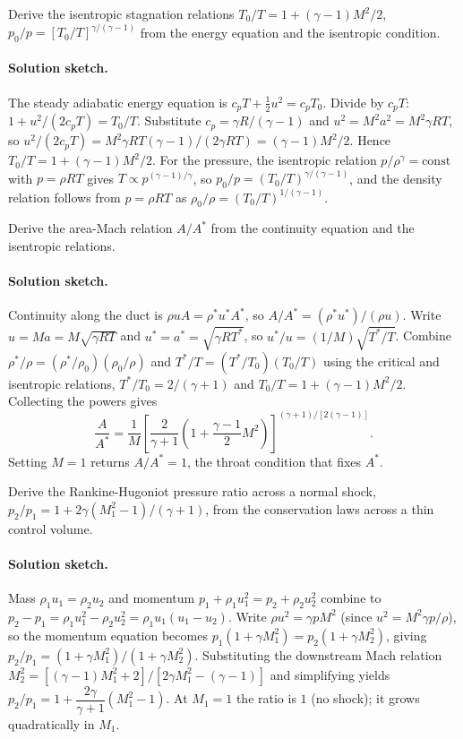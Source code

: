 \begin{exercise}
Derive the isentropic stagnation relations $T_0/T = 1 +
(\gamma - 1)M^2/2$, $p_0/p = [T_0/T]^{\gamma/(\gamma - 1)}$ from
the energy equation and the isentropic condition.
\paragraph{Solution sketch.} The steady adiabatic energy equation is
$c_p T + \tfrac{1}{2}u^2 = c_p T_0$. Divide by $c_p T$:
$1 + u^2/(2 c_p T) = T_0/T$. Substitute $c_p = \gamma R/(\gamma - 1)$
and $u^2 = M^2 a^2 = M^2 \gamma R T$, so $u^2/(2 c_p T) = M^2\gamma RT
(\gamma - 1)/(2\gamma RT) = (\gamma - 1)M^2/2$. Hence $T_0/T = 1 +
(\gamma - 1)M^2/2$. For the pressure, the isentropic relation
$p/\rho^\gamma = \text{const}$ with $p = \rho RT$ gives $T \propto
p^{(\gamma-1)/\gamma}$, so $p_0/p = (T_0/T)^{\gamma/(\gamma - 1)}$, and
the density relation follows from $p = \rho RT$ as $\rho_0/\rho =
(T_0/T)^{1/(\gamma - 1)}$.
\end{exercise}

\begin{exercise}
Derive the area-Mach relation $A/A^*$ from the continuity equation
and the isentropic relations.
\paragraph{Solution sketch.} Continuity along the duct is $\rho u A =
\rho^* u^* A^*$, so $A/A^* = (\rho^* u^*)/(\rho u)$. Write $u = M a =
M\sqrt{\gamma RT}$ and $u^* = a^* = \sqrt{\gamma RT^*}$, so
$u^*/u = (1/M)\sqrt{T^*/T}$. Combine $\rho^*/\rho =
(\rho^*/\rho_0)(\rho_0/\rho)$ and $T^*/T = (T^*/T_0)(T_0/T)$ using the
critical and isentropic relations, $T^*/T_0 = 2/(\gamma + 1)$ and
$T_0/T = 1 + (\gamma-1)M^2/2$. Collecting the powers gives
\[
\frac{A}{A^*} = \frac{1}{M}\left[\frac{2}{\gamma + 1}\left(1 +
\frac{\gamma - 1}{2}M^2\right)\right]^{(\gamma + 1)/[2(\gamma - 1)]}.
\]
Setting $M = 1$ returns $A/A^* = 1$, the throat condition that fixes
$A^*$.
\end{exercise}

\begin{exercise}
Derive the Rankine-Hugoniot pressure ratio across a normal shock,
$p_2/p_1 = 1 + 2\gamma(M_1^2 - 1)/(\gamma + 1)$, from the
conservation laws across a thin control volume.
\paragraph{Solution sketch.} Mass $\rho_1 u_1 = \rho_2 u_2$ and
momentum $p_1 + \rho_1 u_1^2 = p_2 + \rho_2 u_2^2$ combine to
$p_2 - p_1 = \rho_1 u_1^2 - \rho_2 u_2^2 = \rho_1 u_1(u_1 - u_2)$.
Write $\rho u^2 = \gamma p M^2$ (since $u^2 = M^2\gamma p/\rho$), so the
momentum equation becomes $p_1(1 + \gamma M_1^2) = p_2(1 + \gamma
M_2^2)$, giving $p_2/p_1 = (1 + \gamma M_1^2)/(1 + \gamma M_2^2)$.
Substituting the downstream Mach relation $M_2^2 = [(\gamma - 1)M_1^2
+ 2]/[2\gamma M_1^2 - (\gamma - 1)]$ and simplifying yields
$p_2/p_1 = 1 + \dfrac{2\gamma}{\gamma + 1}(M_1^2 - 1)$. At $M_1 = 1$
the ratio is $1$ (no shock); it grows quadratically in $M_1$.
\end{exercise}

